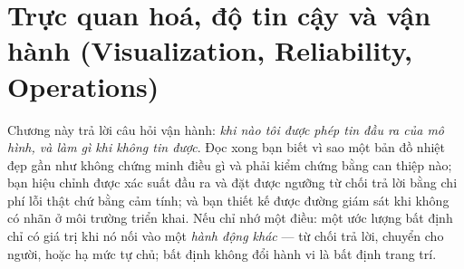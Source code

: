 \documentclass[../../deep_learning.tex]{subfiles}
\begin{document}
\chapter{Trực quan hoá, độ tin cậy và vận hành (Visualization, Reliability, Operations)}

\begin{tomtat}
Chương này trả lời câu hỏi vận hành: \emph{khi nào tôi được phép tin đầu ra của mô hình, và làm gì khi không tin được}. Đọc xong bạn biết vì sao một bản đồ nhiệt đẹp gần như không chứng minh điều gì và phải kiểm chứng bằng can thiệp nào; bạn hiệu chỉnh được xác suất đầu ra và đặt được ngưỡng từ chối trả lời bằng chi phí lỗi thật chứ bằng cảm tính; và bạn thiết kế được đường giám sát khi không có nhãn ở môi trường triển khai. Nếu chỉ nhớ một điều: một ước lượng bất định chỉ có giá trị khi nó nối vào một \emph{hành động khác} --- từ chối trả lời, chuyển cho người, hoặc hạ mức tự chủ; bất định không đổi hành vi là bất định trang trí.
\end{tomtat}
\end{document}
